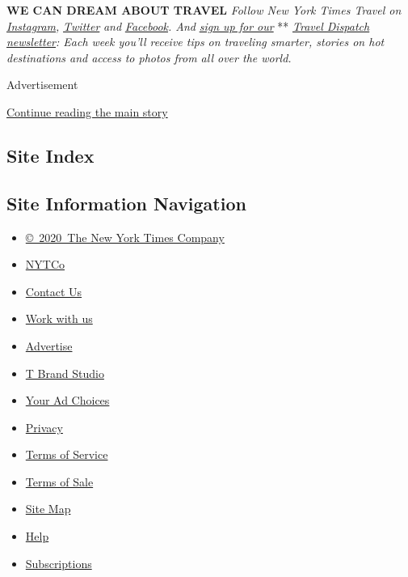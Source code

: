 \textbf{WE CAN DREAM ABOUT TRAVEL} \emph{Follow New York Times Travel
on}
\href{https://www.instagram.com/nytimestravel/}{\emph{Instagram}}\emph{,}
\href{https://twitter.com/nytimestravel}{\emph{Twitter}} \emph{and}
\href{https://www.facebook.com/nytimestravel/}{\emph{Facebook}}\emph{.
And}
\href{https://www.nytimes.com/newsletters/traveldispatch?action=click\&module=inline\&pgtype=Article}{\emph{sign
up for our}} **
\href{https://www.nytimes.com/newsletters/traveldispatch}{\emph{Travel
Dispatch newsletter}}\emph{: Each week you'll receive tips on traveling
smarter, stories on hot destinations and access to photos from all over
the world.}

Advertisement

\protect\hyperlink{after-bottom}{Continue reading the main story}

\hypertarget{site-index}{%
\subsection{Site Index}\label{site-index}}

\hypertarget{site-information-navigation}{%
\subsection{Site Information
Navigation}\label{site-information-navigation}}

\begin{itemize}
\tightlist
\item
  \href{https://help.nytimes.com/hc/en-us/articles/115014792127-Copyright-notice}{©~2020~The
  New York Times Company}
\end{itemize}

\begin{itemize}
\tightlist
\item
  \href{https://www.nytco.com/}{NYTCo}
\item
  \href{https://help.nytimes.com/hc/en-us/articles/115015385887-Contact-Us}{Contact
  Us}
\item
  \href{https://www.nytco.com/careers/}{Work with us}
\item
  \href{https://nytmediakit.com/}{Advertise}
\item
  \href{http://www.tbrandstudio.com/}{T Brand Studio}
\item
  \href{https://www.nytimes.com/privacy/cookie-policy\#how-do-i-manage-trackers}{Your
  Ad Choices}
\item
  \href{https://www.nytimes.com/privacy}{Privacy}
\item
  \href{https://help.nytimes.com/hc/en-us/articles/115014893428-Terms-of-service}{Terms
  of Service}
\item
  \href{https://help.nytimes.com/hc/en-us/articles/115014893968-Terms-of-sale}{Terms
  of Sale}
\item
  \href{https://spiderbites.nytimes.com}{Site Map}
\item
  \href{https://help.nytimes.com/hc/en-us}{Help}
\item
  \href{https://www.nytimes.com/subscription?campaignId=37WXW}{Subscriptions}
\end{itemize}
